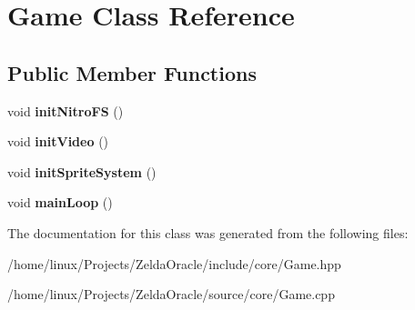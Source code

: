 \hypertarget{classGame}{\section{Game Class Reference}
\label{classGame}
}
\subsection*{Public Member Functions}
\begin{DoxyCompactItemize}
\item 
\hypertarget{classGame_ac353a72ae342972b39efc7809de8fbfe}{void {\bfseries init\+Nitro\+F\+S} ()}\label{classGame_ac353a72ae342972b39efc7809de8fbfe}

\item 
\hypertarget{classGame_acfc5e19ef052dfade3c5a2eff31be13f}{void {\bfseries init\+Video} ()}\label{classGame_acfc5e19ef052dfade3c5a2eff31be13f}

\item 
\hypertarget{classGame_ab2e81e80929c807f557649522d8fbf00}{void {\bfseries init\+Sprite\+System} ()}\label{classGame_ab2e81e80929c807f557649522d8fbf00}

\item 
\hypertarget{classGame_ae89e277761b7dc5bc7a23fd1b4c6f17d}{void {\bfseries main\+Loop} ()}\label{classGame_ae89e277761b7dc5bc7a23fd1b4c6f17d}

\end{DoxyCompactItemize}


The documentation for this class was generated from the following files\+:\begin{DoxyCompactItemize}
\item 
/home/linux/\+Projects/\+Zelda\+Oracle/include/core/Game.\+hpp\item 
/home/linux/\+Projects/\+Zelda\+Oracle/source/core/Game.\+cpp\end{DoxyCompactItemize}
